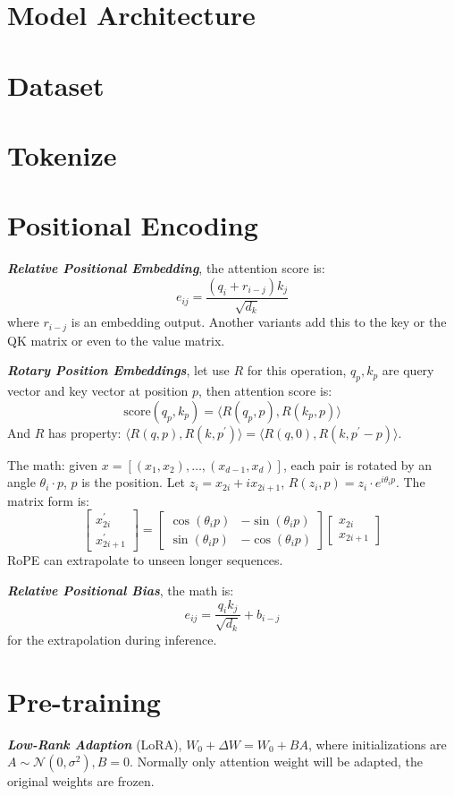 \documentclass[10pt]{elegantbook}
\newcommand{\mydefination}[1]{\textbf{\textit{\textcolor{structurecolor}{#1}}}}
\begin{document}
\section{Model Architecture}

\section{Dataset}

\section{Tokenize}

\section{Positional Encoding}

\mydefination{Relative Positional Embedding}, the attention score is:
\[ e_{ij} = \frac{(q_i + r_{i-j})k_j}{\sqrt{d_k}} \]
where $r_{i-j}$ is an embedding output. Another variants add this to the key or the QK matrix or even to the value matrix.

\mydefination{Rotary Position Embeddings}, let use $R$ for this operation, $q_p, k_p$ are query vector and key vector at position $p$, then attention score is:
\[ \text{score}(q_p, k_p) = \langle R(q_p, p), R(k_p, p) \rangle \]
And $R$ has property: $ \langle R(q, p), R(k, p^{'}) \rangle = \langle R(q, 0), R(k, p^{'} - p) \rangle $.

The math: given $x = [(x_1, x_2), \ldots, (x_{d-1}, x_d)]$, each pair is rotated by an angle $\theta_i \cdot p$, $p$ is the position. 
Let $z_i = x_{2i} + ix_{2i+1}$, $R(z_i,p) = z_i \cdot e^{i\theta_i p}$. The matrix form is:
\[
\begin{bmatrix}
x_{2i}^{'} \\
x_{2i + 1}^{'}
\end{bmatrix}
=
\begin{bmatrix}
\cos(\theta_i p) & -\sin(\theta_i p) \\
\sin(\theta_i p) & -\cos(\theta_i p)
\end{bmatrix}
\begin{bmatrix}
x_{2i} \\
x_{2i + 1}
\end{bmatrix}
\]
RoPE can extrapolate to unseen longer sequences.

\mydefination{Relative Positional Bias}, the math is:
\[ e_{ij} = \frac{q_i k_j}{\sqrt{d_k}} + b_{i-j} \]
for the extrapolation during inference.

\section{Pre-training}

\mydefination{Low-Rank Adaption} (LoRA), $W_0 + \Delta W = W_0 + BA$, where initializations are $A \sim \mathcal N(0, \sigma^2), B=0$. Normally only attention
weight will be adapted, the original weights are frozen.
\end{document}
